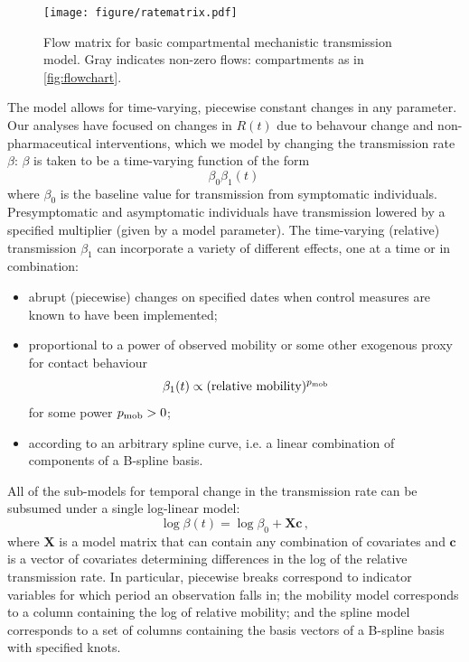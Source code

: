\documentclass[12pt]{article}\usepackage[]{graphicx}\usepackage[]{color}
\begin{document}
\begin{figure}[ht!]
\color{fgcolor}
\texttt{[image: figure/ratematrix.pdf]} 

\caption{Flow matrix for basic compartmental mechanistic transmission
  model.  Gray indicates non-zero flows: compartments as in
  \cref{fig:flowchart}.   
  }
\label{fig:flowmatrix}
\end{figure}

The model allows for time-varying, piecewise constant changes in any
parameter. Our analyses have focused on changes in $R(t)$ due
to behavour change and non-pharmaceutical interventions, which we model
by changing the transmission rate $\beta$: $\beta$
is taken to be a time-varying function of the form
\begin{equation}
  \beta_0 \beta_1(t)  \,
\end{equation}
where $\beta_0$ is the baseline value for transmission
from symptomatic individuals.
Presymptomatic and asymptomatic individuals have transmission lowered by a specified multiplier (given by a model parameter).
The time-varying (relative) transmission $\beta_1$ can incorporate a variety of different effects, one at a time or in combination:
\begin{itemize}
\item abrupt (piecewise) changes on specified dates when control
  measures are known to have been implemented;
\item proportional to a power of observed mobility or some other
  exogenous proxy for contact behaviour
\begin{equation}\label{eq:pmob}
  \beta_1(t) \propto (\text{relative mobility})^{p_{\rm mob}}
\end{equation}
for some power $p_{\rm mob}>0$;
\item according to an arbitrary spline curve, i.e. a linear combination
  of components of a B-spline basis.
\end{itemize}

All of the sub-models for temporal change in the transmission
rate can be subsumed under a single log-linear model:
\begin{equation}\label{eq:betamodel}
\log \beta(t) = \log \beta_0 + \boldsymbol{X}\boldsymbol{c}
\,,
\end{equation}
where $\boldsymbol{X}$ is a model matrix that can contain any combination
of covariates and $\boldsymbol{c}$ is a vector of covariates determining
differences in the log of the relative transmission rate.
In particular, piecewise breaks correspond to indicator variables
for which period an observation falls in; the mobility model corresponds to a column
containing the log of relative mobility; and the spline model corresponds to a set of
columns containing the basis vectors of a B-spline basis with specified knots.
\end{document}
